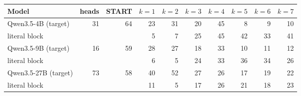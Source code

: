 \begin{tabular}{lrrrrrrrrr}
\toprule
Model & heads & START & $k=1$ & $k=2$ & $k=3$ & $k=4$ & $k=5$ & $k=6$ & $k=7$ \\
\midrule
Qwen3.5-4B (target) & 31 & 64 & 23 & 31 & 20 & 45 & 8 & 9 & 10 \\
\quad literal block & & & 5 & 7 & 25 & 45 & 42 & 33 & 41 \\
Qwen3.5-9B (target) & 16 & 59 & 28 & 27 & 18 & 33 & 10 & 11 & 12 \\
\quad literal block & & & 6 & 5 & 24 & 33 & 36 & 34 & 26 \\
Qwen3.5-27B (target) & 73 & 58 & 40 & 52 & 27 & 26 & 17 & 19 & 22 \\
\quad literal block & & & 11 & 5 & 17 & 26 & 21 & 18 & 23 \\
\bottomrule
\end{tabular}
